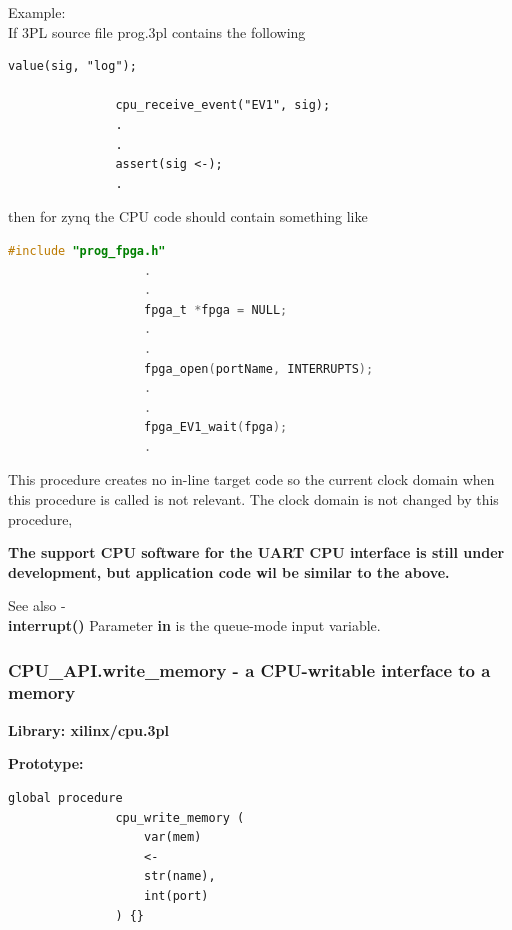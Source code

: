             Example: \\
            If 3PL source file prog.3pl contains the following \\
            \begin{lstlisting}[gobble=12, language=threepl]
               value(sig, "log");

               cpu_receive_event("EV1", sig);
               .
               .
               assert(sig <-);
               .
            \end{lstlisting}
            then for zynq the CPU code should contain something like \\
            \begin{lstlisting}[gobble=12, language=C]
                   #include "prog_fpga.h"
                   .
                   .
                   fpga_t *fpga = NULL;
                   .
                   .
                   fpga_open(portName, INTERRUPTS);
                   .
                   .
                   fpga_EV1_wait(fpga);
                   .
            \end{lstlisting}

            This procedure creates no in-line target code so the current clock domain
            when this procedure is called is not relevant. The clock domain is not
            changed by this procedure,
            
            {\bf The support CPU software for the UART CPU interface is still
            under development, but application code wil be similar to the
            above.}
            
            See also - \\
            {\bf interrupt()} Parameter {\bf in} is the queue-mode input variable.
             \\



            

        \subsubsection{CPU\_API.write\_memory - a CPU-writable interface
                                            to a memory}\label{sec:lpcpuwrmem}

            {\bf Library: xilinx/cpu.3pl}

            {\bf Prototype:} \\
            \vsp
            \begin{lstlisting}[gobble=12, language=threepl]
               global procedure
               cpu_write_memory (
                   var(mem)
                   <-
                   str(name),
                   int(port)
               ) {}
            \end{lstlisting}


